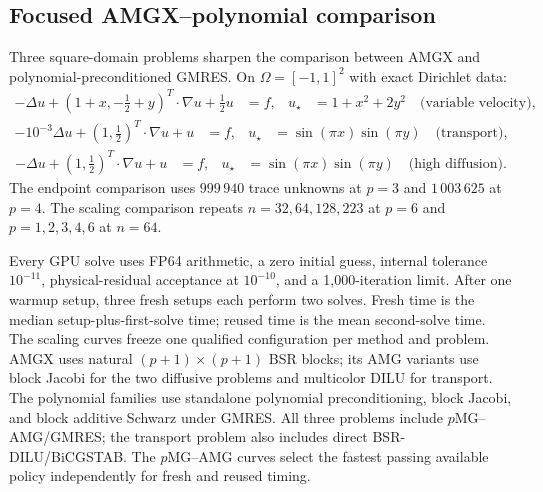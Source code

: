 \providecommand{\ADRResultsPath}{docs/research/solver_studies/adr_scaling_2026_09_17}
\providecommand{\ADRResultsFigurePath}{run_outputs/solver_studies/adr_scaling_2026_09_17/figures}

\subsection{Focused AMGX--polynomial comparison}
\label{sec:adr-focused-comparison}

Three square-domain problems sharpen the comparison between AMGX and
polynomial-preconditioned GMRES. On $\Omega=[-1,1]^2$ with exact Dirichlet data:
\begin{equation}
 \begin{aligned}
 -\Delta u+(1+x,-\tfrac12+y)^T\cdot\nabla u+\tfrac12u&=f,
 &u_\star&=1+x^2+2y^2 \quad\text{(variable velocity)},
 \end{aligned}
\end{equation}
\begin{equation}
 \begin{aligned}
 -10^{-3}\Delta u+(1,\tfrac12)^T\cdot\nabla u+u&=f,
 &u_\star&=\sin(\pi x)\sin(\pi y) \quad\text{(transport)},
 \end{aligned}
\end{equation}
\begin{equation}
 \begin{aligned}
 -\Delta u+(1,\tfrac12)^T\cdot\nabla u+u&=f,
 &u_\star&=\sin(\pi x)\sin(\pi y) \quad\text{(high diffusion)}.
 \end{aligned}
\end{equation}
The endpoint comparison uses $999\,940$ trace unknowns at $p=3$ and
$1\,003\,625$ at $p=4$.  The scaling comparison repeats
$n=32,64,128,223$ at $p=6$ and $p=1,2,3,4,6$ at $n=64$.

Every GPU solve uses FP64 arithmetic, a zero initial guess, internal tolerance
$10^{-11}$, physical-residual acceptance at $10^{-10}$, and a 1,000-iteration
limit.  After one warmup setup, three fresh setups each perform two solves.
Fresh time is the median setup-plus-first-solve time; reused time is the mean
second-solve time.  The scaling curves freeze one qualified configuration per
method and problem.  AMGX uses natural $(p+1)\times(p+1)$ BSR blocks; its AMG
variants use block Jacobi for the two diffusive problems and multicolor DILU
for transport.  The polynomial families use standalone polynomial preconditioning, block Jacobi, and block additive Schwarz under
GMRES.  All three problems include $p$MG--AMG/GMRES; the transport problem
also includes direct BSR-DILU/BiCGSTAB. The $p$MG--AMG curves select the fastest
passing available policy independently for fresh and reused timing.

